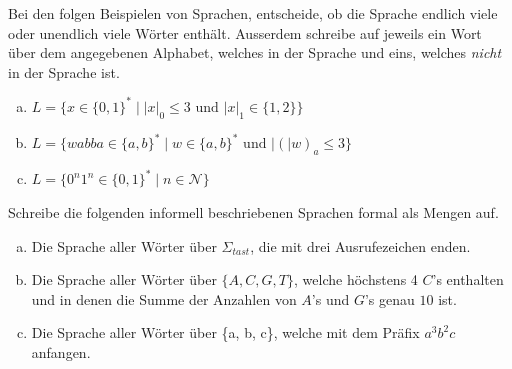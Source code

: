 \documentclass{article}
\newcommand{\abs}[1]{\lvert#1\rvert}
\begin{document}
\begin{exercise}
Bei den folgen Beispielen von Sprachen, entscheide, ob die Sprache endlich viele oder unendlich viele Wörter enthält. Ausserdem schreibe auf jeweils ein Wort über dem angegebenen Alphabet, welches in der Sprache und eins, welches \emph{nicht} in der Sprache ist.

{
\begin{enumerate}[(a)]
    \item \(L = \{x \in \{0,1\}^* \mid \abs{x}_0 \leq 3 \text{ und } \abs{x}_1 \in \{1,2\}\}\) \\
    \blank[width=\linewidth]{}

    \item \(L = \{wabba \in \{a,b\}^* \mid w \in \{a, b\}^* \text{ und } \abs(w)_a \leq 3\}\) \\
    \blank[width=\linewidth]{}
    
    \item \(L = \{0^n 1^n \in \{0, 1\}^* \mid n \in \mathcal{N}\}\) \\
    \blank[width=\linewidth]{}
\end{enumerate}
}
\end{exercise}

\begin{exercise}
Schreibe die folgenden informell beschriebenen Sprachen formal als Mengen auf.


\begin{enumerate}[(a)]
    \item Die Sprache aller Wörter über \(\Sigma_{tast}\), die mit drei Ausrufezeichen enden.\\
    { 
    
    \blank[width=\linewidth]{}}

    \item Die Sprache aller Wörter über \(\{A, C, G, T\}\), welche höchstens 4 \(C\)'s enthalten und in denen die Summe der Anzahlen von \(A\)'s und \(G\)'s genau \(10\) ist. \\
    { 
    
    \blank[width=\linewidth]{}}
    
    \item Die Sprache aller Wörter über \{a, b, c\}, welche mit dem Präfix \(a^3 b^2 c\) anfangen. \\
    { 
    
    \blank[width=\linewidth]{}}
\end{enumerate}
\end{exercise}
\end{document}
